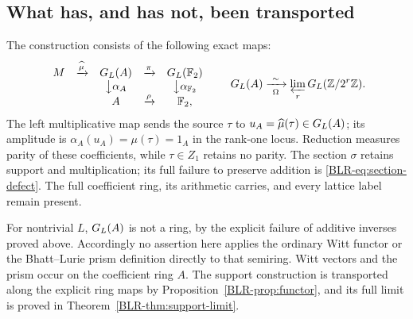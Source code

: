 \subsection{What has, and has not, been transported}
The construction consists of the following exact maps:
\[
\begin{array}{ccccc}
 M&\xrightarrow{\widehat\mu}&G_L(A)&\xrightarrow{\pi}&G_L(\mathbb F_2)\\
 & &\big\downarrow\alpha_A&&\big\downarrow\alpha_{\mathbb F_2}\\
 & & A&\xrightarrow{\rho}&\mathbb F_2,
\end{array}
\qquad
 G_L(A)\xrightarrow[\ \Omega\ ]{\sim}
 \varprojlim_rG_L(\mathbb Z/2^r\mathbb Z).
\]
The left multiplicative map sends the source $\tau$ to
$u_A=\widehat\mu(\tau)\in G_L(A)$; its amplitude is
$\alpha_A(u_A)=\mu(\tau)=1_A$ in the rank-one locus.
Reduction measures parity of these coefficients, while $\tau\in Z_1$
retains no parity. The section $\sigma$
retains support and multiplication; its full failure to preserve
addition is \eqref{BLR-eq:section-defect}. The full coefficient ring,
its arithmetic carries, and every lattice label remain present.

For nontrivial $L$, $G_L(A)$ is not a ring, by the explicit failure of
additive inverses proved above. Accordingly no assertion here applies
the ordinary Witt functor or the Bhatt--Lurie prism definition directly
to that semiring. Witt vectors and the prism occur on the coefficient
ring $A$. The support construction is transported along the explicit
ring maps by Proposition~\ref{BLR-prop:functor}, and its full limit is proved
in Theorem~\ref{BLR-thm:support-limit}.


\endgroup
